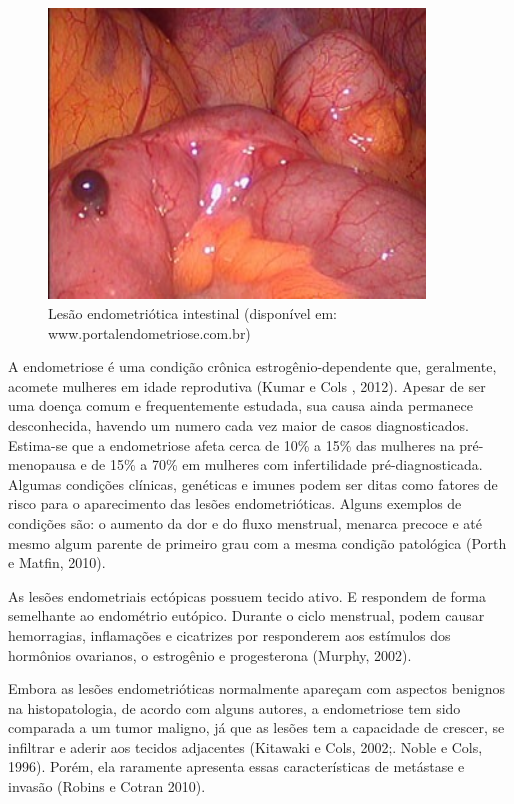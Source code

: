 \documentclass[12pt]{article} %
\begin{document}
\begin{figure}[h!]
\centering
\includegraphics[width=10cm]{intestinal.png}
\caption[Lesão endometriótica intestinal]{Lesão endometriótica intestinal (disponível em: www.portalendometriose.com.br)}  

\end{figure} 

A endometriose é uma condição crônica estrogênio-dependente que,
geralmente, acomete mulheres em idade reprodutiva (Kumar e Cols ,
2012). Apesar de ser uma doença comum e frequentemente estudada, sua
causa ainda permanece desconhecida, havendo um numero cada vez maior
de casos diagnosticados. Estima-se que a endometriose afeta cerca de 10\% a
15\% das mulheres na pré-menopausa e de 15\% a 70\% em mulheres com
infertilidade pré-diagnosticada. Algumas condições clínicas, genéticas
e imunes podem ser ditas como fatores de risco para o aparecimento das
lesões endometrióticas. Alguns exemplos de condições são: o aumento da
dor e do fluxo menstrual, menarca precoce e até mesmo algum parente de
primeiro grau com a mesma condição patológica (Porth e Matfin, 2010).

As lesões endometriais ectópicas possuem tecido ativo. E respondem de
forma semelhante ao endométrio eutópico. Durante o ciclo menstrual,
podem causar hemorragias, inflamações e cicatrizes por responderem aos
estímulos dos hormônios ovarianos, o estrogênio e
progesterona (Murphy, 2002).

Embora as lesões endometrióticas normalmente apareçam com aspectos
benignos na histopatologia, de acordo com alguns autores, a
endometriose tem sido comparada a um tumor maligno, já que as lesões
tem a capacidade de crescer, se infiltrar e aderir aos tecidos
adjacentes (Kitawaki e Cols, 2002;. Noble e Cols, 1996). Porém, ela
raramente apresenta essas características de metástase e invasão
(Robins e Cotran 2010). 
\end{document}
